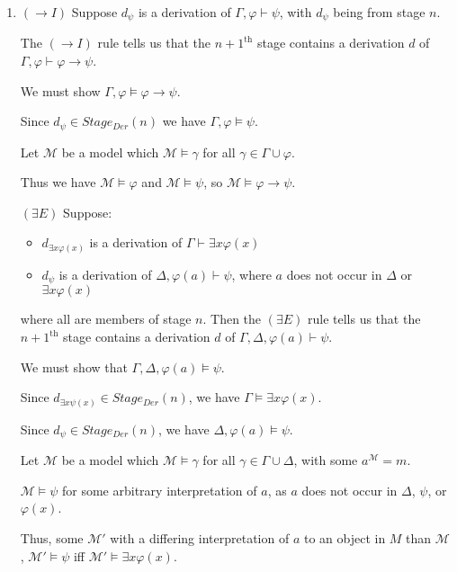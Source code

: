 \documentclass[a4paper]{article}
\newcommand{\MODEL}{\mathcal{M}}
\begin{document}
\begin{enumerate}
    \item $(\to I)$ Suppose $d_{\psi}$ is a derivation of $\Gamma, \varphi \vdash \psi$, with $d_{\psi}$ being from stage $n$.

    The $(\to I)$ rule tells us that the $n + 1^{\text{th}}$ stage contains a derivation $d$ of $\Gamma, \varphi \vdash \varphi \to \psi$.

    We must show $\Gamma, \varphi \models \varphi \to \psi$. 
    
    Since $d_{\psi} \in Stage_{Der}(n)$ we have $\Gamma, \varphi \models \psi$.

    Let $\MODEL$ be a model which $\MODEL \models \gamma$ for all $\gamma \in \Gamma \cup \varphi$.

    Thus we have $\MODEL \models \varphi$ and $\MODEL \models \psi$, so $\MODEL \models \varphi \to \psi$.

    $(\exists E)$ Suppose:
        \begin{itemize}
            \item $d_{\exists x \varphi (x)}$ is a derivation of $\Gamma \vdash \exists x \varphi (x)$
            \item $d_{\psi}$ is a derivation of $\Delta, \varphi(a) \vdash \psi$, where $a$ does not occur in $\Delta$ or $\exists x \varphi (x)$
        \end{itemize}

        where all are members of stage $n$. Then the $(\exists E)$ rule tells us that the $n + 1^{\text{th}}$ stage contains a derivation $d$ of $\Gamma, \Delta, \varphi (a) \vdash \psi$.

        We must show that $\Gamma, \Delta, \varphi (a) \models \psi$.

        Since $d_{\exists x \psi (x)} \in Stage_{Der}(n)$, we have $\Gamma\models \exists x \varphi (x)$.

        Since $d_{\psi} \in Stage_{Der}(n)$, we have $\Delta, \varphi (a) \models \psi$.


    Let $\MODEL$ be a model which $\MODEL \models \gamma$ for all $\gamma \in \Gamma \cup \Delta$, with some $a^{\MODEL} = m$.

    $\MODEL \models \psi$ for some arbitrary interpretation of $a$, as $a$ does not occur in $\Delta$, $\psi$, or $\varphi (x)$.

    Thus, some $\MODEL'$ with a differing interpretation of $a$ to an object in $M$ than $\MODEL$, $\MODEL' \models \psi$ iff $\MODEL' \models \exists x \varphi (x)$.


\end{enumerate}
\end{document}
